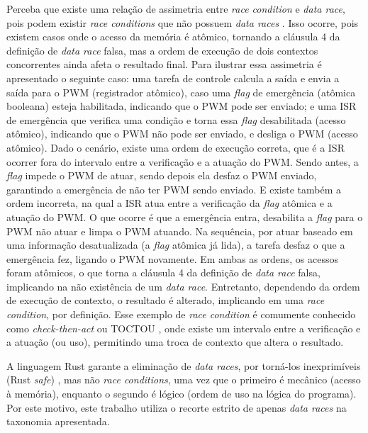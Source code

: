 Perceba que existe uma relação de assimetria entre \textit{race condition} e \textit{data race}, pois podem existir \textit{race conditions} que não possuem \textit{data races} \citep{article:netzer-miller-races}. Isso ocorre, pois existem casos onde o acesso da memória é atômico, tornando a cláusula 4 da definição de \textit{data race} falsa, mas a ordem de execução de dois contextos concorrentes ainda afeta o resultado final. Para ilustrar essa assimetria é apresentado o seguinte caso: uma tarefa de controle calcula a saída e envia a saída para o \ac{PWM} (registrador atômico), caso uma \textit{flag} de emergência (atômica booleana) esteja habilitada, indicando que o \ac{PWM} pode ser enviado; e uma \ac{ISR} de emergência que verifica uma condição e torna essa \textit{flag} desabilitada (acesso atômico), indicando que o \ac{PWM} não pode ser enviado, e desliga o \ac{PWM} (acesso atômico). Dado o cenário, existe uma ordem de execução correta, que é a \ac{ISR} ocorrer fora do intervalo entre a verificação e a atuação do \ac{PWM}. Sendo antes, a \textit{flag} impede o \ac{PWM} de atuar, sendo depois ela desfaz o \ac{PWM} enviado, garantindo a emergência de não ter \ac{PWM} sendo enviado. E existe também a ordem incorreta, na qual a \ac{ISR} atua entre a verificação da \textit{flag} atômica e a atuação do \ac{PWM}. O que ocorre é que a emergência entra, desabilita a \textit{flag} para o \ac{PWM} não atuar e limpa o \ac{PWM} atuando. Na sequência, por atuar baseado em uma informação desatualizada (a \textit{flag} atômica já lida), a tarefa desfaz o que a emergência fez, ligando o \ac{PWM} novamente. Em ambas as ordens, os acessos foram atômicos, o que torna a cláusula 4 da definição de \textit{data race} falsa, implicando na não existência de um \textit{data race}. Entretanto, dependendo da ordem de execução de contexto, o resultado é alterado, implicando em uma \textit{race condition}, por definição. Esse exemplo de \textit{race condition} é comumente conhecido como \textit{check-then-act} ou \ac{TOCTOU} \citep{article:bishop-dilger-toctou}, onde existe um intervalo entre a verificação e a atuação (ou uso), permitindo uma troca de contexto que altera o resultado.

A linguagem Rust garante a eliminação de \textit{data races}, por torná-los inexprimíveis (Rust \textit{safe}) \citep{article:rust-safe-soundness}, mas não \textit{race conditions}, uma vez que o primeiro é mecânico (acesso à memória), enquanto o segundo é lógico (ordem de uso na lógica do programa). Por este motivo, este trabalho utiliza o recorte estrito de apenas \textit{data races} na taxonomia apresentada.

